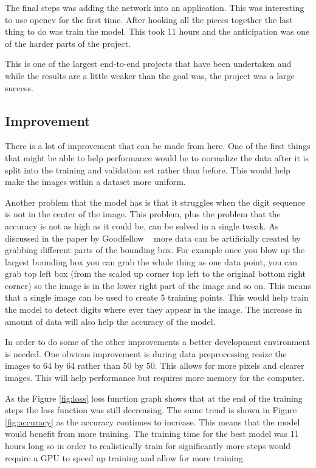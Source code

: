 \documentclass[12pt,twocolumn,letterpaper]{article}
\begin{document}
The final steps was adding the network into an application. This was interesting 
to use opencv for the first time. After hooking all the pieces together the last
thing to do was train the model. This took 11 hours and the anticipation was one 
of the harder parts of the project.

This is one of the largest end-to-end projects that have been undertaken and while 
the results are a little weaker than the goal was, the project was a large success.
\subsection{Improvement}
There is a lot of improvement that can be made from here. One of the first things 
that might be able to help performance would be to normalize the data after it 
is split into the training and validation set rather than before. This would help 
make the images within a dataset more uniform.

Another problem that the model has is that it struggles when the digit sequence 
is not in the center of the image. This problem, plus the problem that the 
accuracy is not as high as it could be, can be solved in a single tweak. As 
discussed in the paper by Goodfellow \etal ~\cite{goodfellow} more data can be artificially created 
by grabbing different parts of the bounding box. For example once you blow up the
largest bounding box you can grab the whole thing as one data point, you can grab 
top left box (from the scaled up corner top left to the original bottom right 
corner) so the image is in the lower right part of the image and so on. This means that a single
image can be used to create 5 training points. This would help train the model to 
detect digits where ever they appear in the image. The increase in amount of data 
will also help the accuracy of the model. 

In order to do some of the other improvements a better development environment 
is needed. One obvious improvement is during data preprocessing resize the images 
to 64 by 64 rather than 50 by 50. This allows for more pixels and clearer images. 
This will help performance but requires more memory for the computer.

As the Figure \ref{fig:loss} loss function graph shows that at the end of the training steps 
the loss function was still decreasing. The same trend is shown in Figure \ref{fig:accuracy} as 
the accuracy continues to increase. This means that the model would benefit from
more training. The training time for the best model was 11 hours long so in order 
to realistically train for significantly more steps would require a GPU to speed 
up training and allow for more training.
\end{document}
